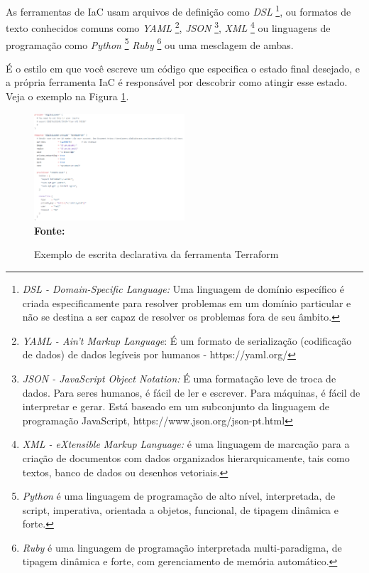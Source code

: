 As ferramentas de IaC usam arquivos de definição como \textit{DSL} 
  \footnote{\textit{DSL - Domain-Specific Language:} Uma linguagem de domínio específico é criada especificamente para resolver problemas em um domínio particular e não se destina a ser capaz de resolver os problemas fora de seu âmbito. }, ou formatos de texto conhecidos comuns como \textit{ YAML} \footnote{\textit{YAML - Ain't  Markup Language}: É um formato de serialização (codificação de dados) de dados legíveis por humanos -  https://yaml.org/ }, \textit{JSON} \footnote{\textit{JSON - JavaScript Object Notation:} É uma formatação leve de troca de dados. Para seres humanos, é fácil de ler e escrever. Para máquinas, é fácil de interpretar e gerar. Está baseado em um subconjunto da linguagem de programação JavaScript, https://www.json.org/json-pt.html}, \textit{XML} \footnote{\textit{XML - eXtensible Markup Language:} é uma linguagem de marcação para a criação de documentos com dados organizados hierarquicamente, tais como textos, banco de dados ou desenhos vetoriais.}
  ou linguagens de programação como \textit{Python} \footnote{\textit{Python} é uma linguagem de programação de alto nível, interpretada, de script, imperativa, orientada a objetos, funcional, de tipagem dinâmica e forte.}  \textit{Ruby} \footnote{\textit{Ruby} é uma linguagem de programação interpretada multi-paradigma, de tipagem dinâmica e forte, com gerenciamento de memória automático.}  ou uma mesclagem de ambas.
 
  É o estilo em que você escreve um código que especifica o estado final desejado, e a própria ferramenta IaC é responsável por descobrir como atingir esse estado. Veja o exemplo na Figura \ref{fig:figura2}.
 
 \begin{figure}[ht]
	\centering	
	\caption[\hspace{0.1cm}Exemplo declarativo]{Exemplo de escrita declarativa da ferramenta Terraform}
	\vspace{-0.4cm}
	\includegraphics[width=0.5\textwidth]{artigo/figuras/terraform-declarative-exemple-01.png}
	 \vspace{-0.2cm}
	\\\textbf{\footnotesize Fonte: \cite{chef01} }
	\label{fig:figura2}
\end{figure}
\vspace{-0.5cm}
 
